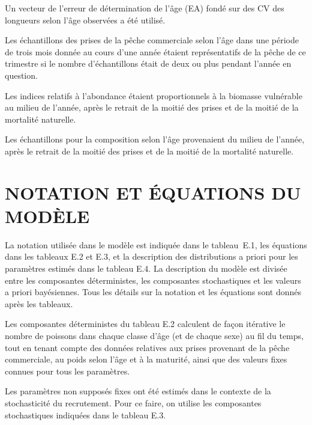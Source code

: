 \documentclass[11pt]{book}
\def\AppLet{E}                   %
\begin{document}
\begin{enumerate_csas}{}{}
\item Un vecteur de l'erreur de d\'{e}termination de l'\^{a}ge (EA) fond\'{e} sur des CV des longueurs selon l'\^{a}ge observ\'{e}es a \'{e}t\'{e} utilis\'{e}.
\item Les \'{e}chantillons des prises de la p\^{e}che commerciale selon l'\^{a}ge dans une p\'{e}riode de trois mois donn\'{e}e au cours d'une ann\'{e}e \'{e}taient repr\'{e}sentatifs de la p\^{e}che de ce trimestre si le nombre d'\'{e}chantillons \'{e}tait de deux ou plus pendant l'ann\'{e}e en question.
\item Les indices relatifs \`{a} l'abondance \'{e}taient proportionnels \`{a} la biomasse vuln\'{e}rable au milieu de l'ann\'{e}e, apr\`{e}s le retrait de la moiti\'{e} des prises et de la moiti\'{e} de la mortalit\'{e} naturelle.
\item Les \'{e}chantillons pour la composition selon l'\^{a}ge provenaient du milieu de l'ann\'{e}e, apr\`{e}s le retrait de la moiti\'{e} des prises et de la moiti\'{e} de la mortalit\'{e} naturelle.
\end{enumerate_csas}

\section{NOTATION ET \'{E}QUATIONS DU MOD\`{E}LE}

La notation utilis\'{e}e dans le mod\`{e}le est indiqu\'{e}e dans le tableau~\AppLet.1, les \'{e}quations dans les tableaux \AppLet.2 et \AppLet.3, et la description des distributions a priori pour les param\`{e}tres estim\'{e}s dans le tableau \AppLet.4. La description du mod\`{e}le est divis\'{e}e entre les composantes d\'{e}terministes, les composantes stochastiques et les valeurs a priori bay\'{e}siennes. Tous les d\'{e}tails sur la notation et les \'{e}quations sont donn\'{e}s apr\`{e}s les tableaux. %

Les composantes d\'{e}terministes du tableau \AppLet.2 calculent de fa\c{c}on it\'{e}rative le nombre de poissons dans chaque classe d'\^{a}ge (et de chaque sexe) au fil du temps, tout en tenant compte des donn\'{e}es relatives aux prises provenant de la p\^{e}che commerciale, au poids selon l'\^{a}ge et \`{a} la maturit\'{e}, ainsi que des valeurs fixes connues pour tous les param\`{e}tres.

Les param\`{e}tres non suppos\'{e}s fixes ont \'{e}t\'{e} estim\'{e}s dans le contexte de la stochasticit\'{e} du recrutement. Pour ce faire, on utilise les composantes stochastiques indiqu\'{e}es dans le tableau \AppLet.3. 
\end{document}
